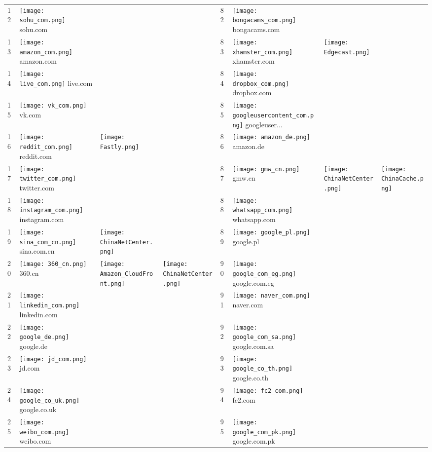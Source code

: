 \begin{table}[]
\begin{tabular}{|llll|llll|}
12 & \texttt{[image: sohu\_com.png]} sohu.com & & & 82 & \texttt{[image: bongacams\_com.png]} bongacams.com & & \\
13 & \texttt{[image: amazon\_com.png]} amazon.com & & & 83 & \texttt{[image: xhamster\_com.png]} xhamster.com & \texttt{[image: Edgecast.png]} & \\
14 & \texttt{[image: live\_com.png]} live.com & & & 84 & \texttt{[image: dropbox\_com.png]} dropbox.com & & \\
15 & \texttt{[image: vk\_com.png]} vk.com & & & 85 & \texttt{[image: googleusercontent\_com.png]} googleuser... & & \\
16 & \texttt{[image: reddit\_com.png]} reddit.com & \texttt{[image: Fastly.png]} & & 86 & \texttt{[image: amazon\_de.png]} amazon.de & & \\
17 & \texttt{[image: twitter\_com.png]} twitter.com & & & 87 & \texttt{[image: gmw\_cn.png]} gmw.cn & \texttt{[image: ChinaNetCenter.png]} & \texttt{[image: ChinaCache.png]} \\
18 & \texttt{[image: instagram\_com.png]} instagram.com & & & 88 & \texttt{[image: whatsapp\_com.png]} whatsapp.com & & \\
19 & \texttt{[image: sina\_com\_cn.png]} sina.com.cn & \texttt{[image: ChinaNetCenter.png]} & & 89 & \texttt{[image: google\_pl.png]} google.pl & & \\
20 & \texttt{[image: 360\_cn.png]} 360.cn & \texttt{[image: Amazon\_CloudFront.png]} & \texttt{[image: ChinaNetCenter.png]} & 90 & \texttt{[image: google\_com\_eg.png]} google.com.eg & & \\
21 & \texttt{[image: linkedin\_com.png]} linkedin.com & & & 91 & \texttt{[image: naver\_com.png]} naver.com & & \\
22 & \texttt{[image: google\_de.png]} google.de & & & 92 & \texttt{[image: google\_com\_sa.png]} google.com.sa & & \\
23 & \texttt{[image: jd\_com.png]} jd.com & & & 93 & \texttt{[image: google\_co\_th.png]} google.co.th & & \\
24 & \texttt{[image: google\_co\_uk.png]} google.co.uk & & & 94 & \texttt{[image: fc2\_com.png]} fc2.com & & \\
25 & \texttt{[image: weibo\_com.png]} weibo.com & & & 95 & \texttt{[image: google\_com\_pk.png]} google.com.pk & & \\

\end{tabular}
\end{table}
